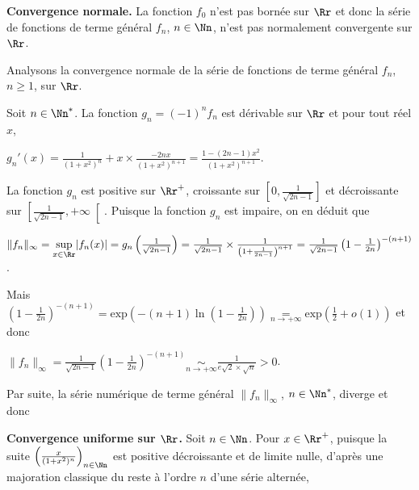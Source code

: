 {\begin{enumerate}
{\textbf{Convergence normale.} La fonction $f_0$ n'est pas bornée sur $\Rr$ et donc la série de fonctions de terme général $f_n$, $n\in\Nn$, n'est pas normalement convergente sur $\Rr$.

Analysons la convergence normale de la série de fonctions de terme général $f_n$, $n\geqslant1$, sur $\Rr$.

Soit $n\in\Nn^*$. La fonction $g_n=(-1)^nf_n$ est dérivable sur $\Rr$ et pour tout réel $x$,

\begin{center}
$g_n'(x)=\frac{1}{(1+x^2)^n}+x\times\frac{-2nx}{(1+x^2)^{n+1}}=\frac{1-(2n-1)x^2}{(1+x^2)^{n+1}}$.
\end{center}

La fonction $g_n$ est positive sur $\Rr^+$, croissante sur $\left[0,\frac{1}{\sqrt{2n-1}}\right]$ et décroissante sur $\left[\frac{1}{\sqrt{2n-1}},+\infty\right[$. Puisque la fonction $g_n$ est impaire, on en déduit que

\begin{center}
$\|f_n\|_\infty=\underset{x\in\Rr}{\text{sup}}|f_n(x)|=g_n\left(\frac{1}{\sqrt{2n-1}}\right)=\frac{1}{\sqrt{2n-1}}\times\frac{1}{\left(1+\frac{1}{2n-1}\right)^{n+1}}=\frac{1}{\sqrt{2n-1}}\left(1-\frac{1}{2n}\right)^{-(n+1)}$.
\end{center}

Mais $\left(1-\frac{1}{2n}\right)^{-(n+1)}=\text{exp}\left(-(n+1)\ln\left(1-\frac{1}{2n}\right)\right)\underset{n\rightarrow+\infty}{=}\text{exp}\left(\frac{1}{2}+o(1)\right)$ et donc 

\begin{center}
$\|f_n\|_\infty=\frac{1}{\sqrt{2n-1}}\left(1-\frac{1}{2n}\right)^{-(n+1)}\underset{n\rightarrow+\infty}{\sim}\frac{1}{e\sqrt{2}\times\sqrt{n}}>0$.
\end{center}

Par suite, la série numérique de terme général $\|f_n\|_\infty$, $n\in\Nn^*$, diverge et donc

\begin{center}
\end{center}

\textbf{Convergence uniforme sur $\Rr$.} Soit $n\in\Nn$. Pour $x\in\Rr^+$, puisque la suite $\left(\frac{x}{(1+x^2)^n}\right)_{n\in\Nn}$ est positive décroissante et de limite nulle, d'après une majoration classique du reste à l'ordre $n$ d'une série alternée,

}
\end{enumerate}}
